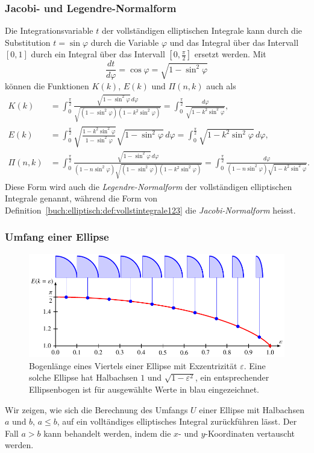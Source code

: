 \subsubsection{Jacobi- und Legendre-Normalform}
Die Integrationsvariable $t$ der vollständigen elliptischen Integrale
kann durch die Substitution $t=\sin\varphi$ durch die Variable
$\varphi$ und das Integral über das Intervall $[0,1]$ durch ein
Integral über das Intervall $[0,\frac{\pi}2]$ ersetzt werden.
Mit
\[
\frac{dt}{d\varphi} = \cos\varphi = \sqrt{1-\sin^2\varphi}
\]
können die Funktionen $K(k)$, $E(k)$ und $\Pi(n,k)$ auch als
\begin{align*}
K(k)
&=
\int_0^{\frac{\pi}2}
\frac{
\sqrt{1-\sin^2\varphi}\,d\varphi
}{
\sqrt{(1-\sin^2\varphi)(1-k^2\sin^2\varphi)}
}
=
\int_0^{\frac{\pi}2}
\frac{d\varphi}{\sqrt{1-k^2\sin^2\varphi}}
,
\\
E(k)
&=
\int_0^{\frac{\pi}2}
\sqrt{\frac{1-k^2\sin^2\varphi}{1-\sin^2\varphi}}\sqrt{1-\sin^2\varphi}\,d\varphi
=
\int_0^{\frac{\pi}2}
\sqrt{1-k^2\sin^2\varphi}\,d\varphi
,
\\
\Pi(n,k)
&=
\int_0^{\frac{\pi}2}
\frac{
\sqrt{1-\sin^2\varphi}\,d\varphi
}{
(1-n\sin^2\varphi)\sqrt{(1-\sin^2\varphi)(1-k^2\sin^2\varphi)}
}
=
\int_0^{\frac{\pi}2}
\frac{
d\varphi
}{
(1-n\sin^2\varphi)\sqrt{1-k^2\sin^2\varphi}
}
.
\end{align*}
Diese Form wird auch die {\em Legendre-Normalform} der vollständigen 
%
elliptischen Integrale genannt, während die Form von
Definition~\ref{buch:elliptisch:def:vollstintegrale123}
die {\em Jacobi-Normalform} heisst.
%

\subsubsection{Umfang einer Ellipse}
\begin{figure}
\centering
\includegraphics{chapters/110-elliptisch/images/ellipsenumfang.pdf}
\caption{Bogenlänge eines Viertels einer Ellipse mit Exzentrizität
$\varepsilon$.
Eine solche Ellipse hat Halbachsen $1$ und $\sqrt{1-\varepsilon^2}$,
ein entsprechender Ellipsenbogen ist für ausgewählte Werte in blau
eingezeichnet.
\label{buch:elliptisch:fig:ellipsenumfang}}
\end{figure}
Wir zeigen, wie sich die Berechnung des Umfangs $U$ einer Ellipse
mit Halbachsen $a$ und $b$, $a\le b$, auf ein volltändiges elliptisches
Integral zurückführen lässt.
Der Fall $a>b$ kann behandelt werden, indem die $x$- und $y$-Koordinaten
vertauscht werden.


